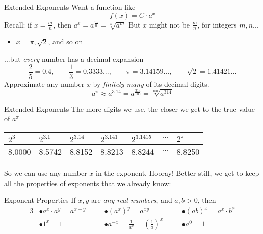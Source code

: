 \documentclass[]{beamer}
\begin{document}
	\begin{frame}{Extended Exponents}
		Want a function like
		\begin{equation*}
			f(x) = C\cdot a^x
		\end{equation*}
		\pause
		Recall: if $x = \frac{m}{n}$, then $a^x = a^\frac{m}{n} = \sqrt[n]{a^m}$
		\pause
		\vfill
		But $x$ might not be $\frac{m}{n}$, for integers $m,n$...
		\pause\vfill
		\begin{itemize}
			\item $x = \pi, \sqrt{2}$, and so on
		\end{itemize}
		\pause
		\vfill
		...but \textit{every} number has a decimal expansion
		\begin{equation*}
			\frac{2}{5} = 0.4, \qquad \frac{1}{3} = 0.3333..., \qquad \pi=3.14159..., \qquad \sqrt{2} = 1.41421...
		\end{equation*}
		\pause\vfill
		Approximate any number $x$ by \textit{finitely many} of its decimal digits.
		\begin{equation*}
			a^\pi \approx a^{3.14} = a^{\frac{314}{100}} = \sqrt[100]{a^{314}}
		\end{equation*}
	\end{frame}

	\begin{frame}{Extended Exponents}
		The more digits we use, the closer we get to the true value of $a^\pi$
		\vfill
		\begin{center}
		\begin{tabular}{@{}lllllcl@{}}
			$2^3$ & $2^{3.1}$ & $2^{3.14}$ & $2^{3.141}$ & $2^{3.1415}$ & $\cdots$ & $2^\pi$\\
			\midrule
			8.0000 & 8.5742 & 8.8152 & 8.8213 & 8.8244 & $\cdots$ & 8.8250
		\end{tabular}
		\end{center}
		\pause
		\vfill
		So we can use any number $x$ in the exponent. Hooray!
		\pause
		\vfill
		Better still, we get to keep all the properties of exponents that we already know:
		\begin{block}{Exponent Properties}
			If $x,y$ are \textit{any real numbers}, and $a,b > 0$, then
			\begin{alignat*}{3}
				&\bullet a^x\cdot a^y = a^{x+y} &\quad &\bullet \left(a^x\right)^y = a^{xy} &\quad &\bullet (ab)^x = a^x\cdot b^x \\
				&\bullet 1^x = 1 &\quad &\bullet a^{-x} = \frac{1}{a^x} = \left(\frac{1}{a}\right)^x &\quad &\bullet a^0 = 1
			\end{alignat*}
		\end{block}
	\end{frame}
\end{document}
